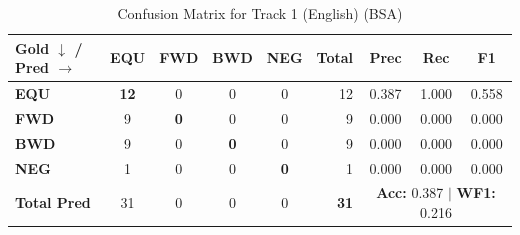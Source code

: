\begin{table}[ht]
\centering
\small
\begin{tabular}{l|cccc|r|ccc}
\toprule
\textbf{Gold $\downarrow$ / Pred $\rightarrow$} & \textbf{EQU} & \textbf{FWD} & \textbf{BWD} & \textbf{NEG} & \textbf{Total} & \textbf{Prec} & \textbf{Rec} & \textbf{F1} \\
\midrule
\textbf{EQU} & \textbf{12} & 0 & 0 & 0 & 12 & 0.387 & 1.000 & 0.558 \\
\textbf{FWD} & 9 & \textbf{0} & 0 & 0 & 9 & 0.000 & 0.000 & 0.000 \\
\textbf{BWD} & 9 & 0 & \textbf{0} & 0 & 9 & 0.000 & 0.000 & 0.000 \\
\textbf{NEG} & 1 & 0 & 0 & \textbf{0} & 1 & 0.000 & 0.000 & 0.000 \\
\midrule
\textbf{Total Pred} & 31 & 0 & 0 & 0 & \textbf{31} & \multicolumn{3}{c}{\textbf{Acc:} 0.387 $\mid$ \textbf{WF1:} 0.216} \\
\bottomrule
\end{tabular}
\caption{Confusion Matrix for Track 1 (English) (BSA)}
\label{tab:confusion_matrix}
\end{table}